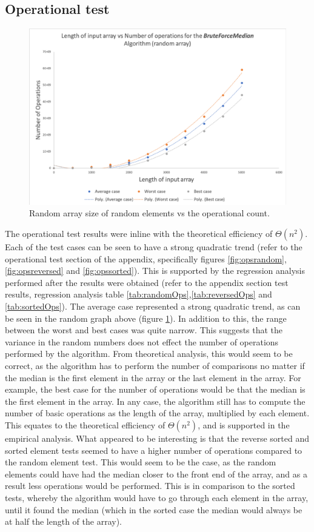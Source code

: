 \documentclass[12pt]{article}
\begin{document}
\subsection{Operational test}
\begin{figure}[H]
	\centering
	\includegraphics[width=0.75\linewidth]{Results/OpsRandom}
	\caption{Random array size of random elements vs the operational count.}
	\label{fig:opsrandomAnalysis}
\end{figure}

The operational test results were inline with the theoretical efficiency of $\Theta (n^2)$. Each of the test cases can be seen to have a strong quadratic trend (refer to the operational test section of the appendix, specifically figures \ref{fig:opsrandom}, \ref{fig:opsreversed} and \ref{fig:opssorted}). This is supported by the regression analysis performed after the results were obtained (refer to the appendix section test results, regression analysis table \ref{tab:randomOps},\ref{tab:reversedOps} and \ref{tab:sortedOps}). The average case represented a strong quadratic trend, as can be seen in the random graph above (figure \ref{fig:opsrandomAnalysis}). In addition to this, the range between the worst and best cases was quite narrow. This suggests that the variance in the random numbers does not effect the number of operations performed by the algorithm. From theoretical analysis, this would seem to be correct, as the algorithm has to perform the number of comparisons no matter if the median is the first element in the array or the last element in the array. For example, the best case for the number of operations would be that the median is the first element in the array. In any case, the algorithm still has to compute the number of basic operations as the length of the array, multiplied by each element. This equates to the theoretical efficiency of $\Theta (n^2)$, and is supported in the empirical analysis. 
What appeared to be interesting is that the reverse sorted and sorted element tests seemed to have a higher number of operations compared to the random element test. This would seem to be the case, as the random elements could have had the median closer to the front end of the array, and as a result less operations would be performed. This is in comparison to the sorted tests, whereby the algorithm would have to go through each element in the array, until it found the median (which in the sorted case the median would always be at half the length of the array).
\end{document}
